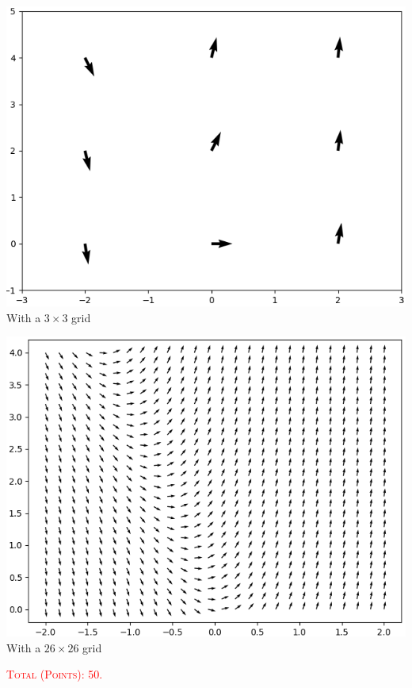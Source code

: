 \documentclass[12pt]{article}
\begin{document}
		\begin{minipage}{0.5\textwidth}
		\centering
		\includegraphics[scale=0.5]{exo15-sec1_3.png}
		With a $3 \times 3$ grid
		\end{minipage}
		\begin{minipage}{0.5\textwidth}
		\centering
		\includegraphics[scale=0.5]{exo15-sec1_3-more.png}
		With a $26 \times 26$ grid
		\end{minipage}
		
	\vfill
	
	\hfill \textcolor{red}{\textsc{Total (Points): 50.}}
	
\end{document}
